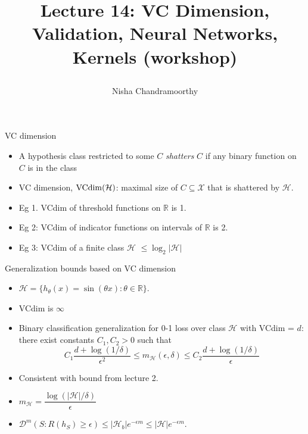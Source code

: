 \documentclass[final]{beamer}
\title{\begin{huge}{Lecture 14: VC Dimension, Validation, Neural Networks, Kernels (workshop)}\end{huge}} %
\author{Nisha Chandramoorthy} %
\begin{document}
\frame{\titlepage}

\begin{frame}{VC dimension}
	\begin{itemize}
		\item A hypothesis class restricted to some $C$ \emph{shatters} $C$ if any binary function on $C$ is in the class
		\pause
		\item VC dimension, ${\rm VCdim}(\mathcal{H})$: maximal size of $C \subseteq \mathcal{X}$ that is shattered by $\mathcal{H}.$ 
		\pause
		\item Eg 1. VCdim of threshold functions on $\mathbb{R}$ is 1.
		\pause
		\item Eg 2: VCdim of indicator functions on intervals of $\mathbb{R}$ is 2.
		\pause
		\item Eg 3: VCdim of a finite class $\mathcal{H}$ $\leq \log_2|\mathcal{H}|$ 
	\end{itemize}
\end{frame}
\begin{frame}{Generalization bounds based on VC dimension}
	\begin{itemize}
		\item $\mathcal{H} = \{h_\theta(x) = \sin(\theta x): \theta \in \mathbb{R}\}$.
		\pause
		\item VCdim is $\infty$
		\pause 
	\item Binary classification generalization for 0-1 loss over class $\mathcal{H}$ with VCdim = $d$: there exist constants $C_1, C_2 > 0$ such that 
		$$ C_1 \dfrac{d + \log(1/\delta)}{\epsilon^2} \leq m_{\mathcal{H}}(\epsilon, \delta) \leq C_2 \dfrac{d + \log(1/\delta)}{\epsilon}$$
	
	\end{itemize}

\end{frame}
\begin{frame}
	\begin{itemize}
		\item Consistent with bound from lecture 2.
		\pause
		\item $m_{\mathcal{H}} = \dfrac{\log(|\mathcal{H}|/\delta)}{\epsilon}$ 
		\item $\mathcal{D}^m({S: R(h_S) \geq \epsilon}) \leq |\mathcal{H}_b| e^{-\epsilon m}\leq |\mathcal{H}| e^{-\epsilon m}.$
		\pause
	\end{itemize}
\end{frame}
\end{document}
